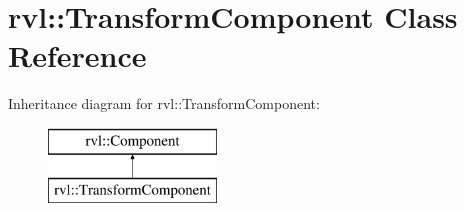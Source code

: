 \hypertarget{classrvl_1_1_transform_component}{}\section{rvl\+:\+:Transform\+Component Class Reference}
\label{classrvl_1_1_transform_component}
Inheritance diagram for rvl\+:\+:Transform\+Component\+:\begin{figure}[H]
\begin{center}
\leavevmode
\includegraphics[height=2.000000cm]{classrvl_1_1_transform_component}
\end{center}
\end{figure}
